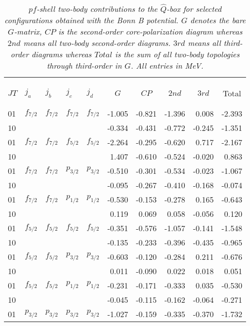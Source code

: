 \clearpage
\begin{table}[hbtp]
\caption{{\em $pf$-shell two-body contributions to the $\hat{Q}$-box
for selected configurations
obtained with the Bonn B potential.
$G$ denotes the bare $G$-matrix, $CP$
is the second-order core-polarization diagram
whereas $2nd$ means all two-body second-order diagrams.
$3rd$ means all third-order diagrams whereas $Total$ is the
sum of all two-body topologies
through third-order in $G$. All entries in MeV.}}
\begin{center}
\begin{tabular}{lllllrrrrr}
&&&&&&&&&\\
&&&&&&&&&\\ \hline
&&&&&&&&&\\
$JT$&$j_{a}$&$j_{b}$&$j_{c}$&$j_{d}$&
\multicolumn{1}{c}{$G$}&
\multicolumn{1}{c}{$CP$}&
\multicolumn{1}{c}{$2nd$}&
\multicolumn{1}{c}{$3rd$}&
\multicolumn{1}{c}{Total}
\\&&&&&&&&&\\  \hline&&&&&&&&&\\
01&$f_{7/2}$&$f_{7/2}$&$f_{7/2}$&$f_{7/2}$
&-1.005&-0.821&-1.396&0.008&-2.393\\
10&&&&&-0.334&-0.431&-0.772&-0.245&-1.351\\
01&$f_{7/2}$&$f_{7/2}$&$f_{5/2}$&$f_{5/2}$
&-2.264&-0.295&-0.620&0.717&-2.167\\
10&&&&&1.407&-0.610&-0.524&-0.020&0.863\\
01&$f_{7/2}$&$f_{7/2}$&$p_{3/2}$&$p_{3/2}$
&-0.510&-0.301&-0.534&-0.023&-1.067\\
10&&&&&-0.095&-0.267&-0.410&-0.168&-0.074\\
01&$f_{7/2}$&$f_{7/2}$&$p_{1/2}$&$p_{1/2}$
&-0.530&-0.153&-0.278&0.165&-0.643\\
10&&&&&0.119&0.069&0.058&-0.056&0.120\\
01&$f_{5/2}$&$f_{5/2}$&$f_{5/2}$&$f_{5/2}$
&-0.351&-0.576&-1.057&-0.141&-1.548\\
10&&&&&-0.135&-0.233&-0.396&-0.435&-0.965\\
01&$f_{5/2}$&$f_{5/2}$&$p_{3/2}$&$p_{3/2}$
&-0.603&-0.120&-0.284&0.211&-0.676\\
10&&&&&0.011&-0.090&0.022&0.018&0.051\\
01&$f_{5/2}$&$f_{5/2}$&$p_{1/2}$&$p_{1/2}$
&-0.231&-0.171&-0.333&0.035&-0.530\\
10&&&&&-0.045&-0.115&-0.162&-0.064&-0.271\\
01&$p_{3/2}$&$p_{3/2}$&$p_{3/2}$&$p_{3/2}$
&-1.027&-0.159&-0.335&-0.370&-1.732\\

\end{tabular}
\end{center}
\end{table}
